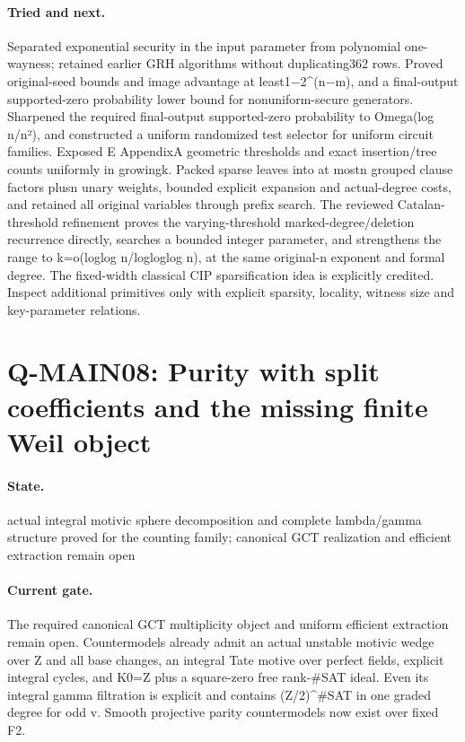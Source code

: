 \paragraph{Tried and next.} Separated exponential security in the input parameter from polynomial one-wayness; retained earlier GRH algorithms without duplicating362 rows. Proved original-seed bounds and image advantage at least1−2\textasciicircum{}(n−m), and a final-output supported-zero probability lower bound for nonuniform-secure generators. Sharpened the required final-output supported-zero probability to Omega(log n/n²), and constructed a uniform randomized test selector for uniform circuit families. Exposed E AppendixA geometric thresholds and exact insertion/tree counts uniformly in growingk. Packed sparse leaves into at mostn grouped clause factors plusn unary weights, bounded explicit expansion and actual-degree costs, and retained all original variables through prefix search. The reviewed Catalan-threshold refinement proves the varying-threshold marked-degree/deletion recurrence directly, searches a bounded integer parameter, and strengthens the range to k=o(loglog n/logloglog n), at the same original-n exponent and formal degree. The fixed-width classical CIP sparsification idea is explicitly credited. Inspect additional primitives only with explicit sparsity, locality, witness size and key-parameter relations.

\section{Q-MAIN08: Purity with split coefficients and the missing finite Weil object}
\paragraph{State.} actual integral motivic sphere decomposition and complete lambda/gamma structure proved for the counting family; canonical GCT realization and efficient extraction remain open
\paragraph{Current gate.} The required canonical GCT multiplicity object and uniform efficient extraction remain open. Countermodels already admit an actual unstable motivic wedge over Z and all base changes, an integral Tate motive over perfect fields, explicit integral cycles, and K0=Z plus a square-zero free rank-\#SAT ideal. Even its integral gamma filtration is explicit and contains (Z/2)\textasciicircum{}\#SAT in one graded degree for odd v. Smooth projective parity countermodels now exist over fixed F2.
